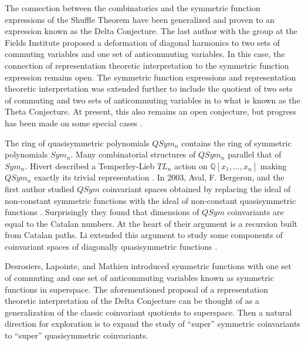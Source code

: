 \documentclass[submission]{FPSAC2023}
\theoremstyle{definition}
\numberwithin{equation}{section}
\begin{document}
The connection between the combinatorics and the symmetric function expressions of the Shuffle Theorem have been generalized \cite{HRW} and proven \cite{DM} to an expression known as the Delta Conjecture.  The last author with the group at the Fields Institute \cite{Z} proposed a deformation of diagonal harmonics to two sets of commuting variables and one set of anticommuting variables. In this case, the connection of representation theoretic interpretation to the symmetric function expression remains open.  The symmetric function expressions and representation theoretic interpretation was extended further to include the quotient of two sets of commuting and two sets of anticommuting variables in \cite{DIW} to what is known as the Theta Conjecture.  At present, this also remains an open conjecture, but progress has been made on some special cases \cite{IRR, KR, SW, SW2}.

The ring of quasisymmetric polynomials $QSym_{n}$ contains the ring of symmetric polynomials $Sym_{n}$.  Many combinatorial structures of $QSym_{n}$ parallel that of $Sym_{n}$.  Hivert described a Temperley-Lieb $TL_{n}$ action on $\mathbb{Q}[x_{1},\dots,x_{n}]$ making $QSym_{n}$ exactly its trivial representation \cite{Hi}.  In 2003, Aval, F. Bergeron, and the first author studied $QSym$ coinvariant spaces obtained by replacing the ideal of non-constant symmetric functions with the ideal of non-constant quasisymmetric functions \cite{ABB,AB}.  Surprisingly they found that dimensions of $QSym$ coinvariants are equal to the Catalan numbers.  At the heart of their argument is a recursion built from Catalan paths.  Li extended this argument to study some components of coinvariant spaces of diagonally quasisymmetric functions \cite{L}.

Desrosiers, Lapointe, and Mathieu \cite{DLM,DLM2} introduced symmetric functions with one set of commuting and one set of anticommuting variables known as symmetric functions in superspace.  The aforementioned proposal \cite{Z} of a representation theoretic interpretation of the Delta Conjecture can be thought of as a generalization of the classic coinvariant quotients to superspace.  Then a natural direction for exploration is to expand the study of ``super'' symmetric coinvariants to ``super'' quasisymmetric coinvariants.
\end{document}
